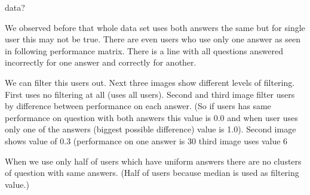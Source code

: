 \documentclass[
  digital, %
  table,   %
  nolof,     %
  nolot,     %
  nocover
]{fithesis3}
\begin{document}

data?


We observed before that whole data set uses both answers the same but
for single user this may not be true. There are even users who use only
one answer as seen in following performance matrix. There is a line with
all questions answered incorrectly for one answer and correctly for
another.


We can filter this users out. Next three images show different levels of
filtering. First uses no filtering at all (uses all users). Second and
third image filter users by difference between performance on each
answer. (So if users has same performance on question with both answers
this value is 0.0 and when user uses only one of the answers (biggest
possible difference) value is 1.0). Second image shows value of 0.3
(performance on one answer is 30%
third image uses value 6%


When we use only half of users which have uniform answers there are no
clusters of question with same answers. (Half of users because median is
used as filtering value.)
\end{document}

